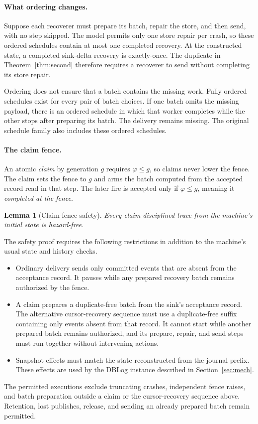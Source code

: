 \documentclass[sigplan,10pt]{acmart}
\theoremstyle{plain}
\newtheorem{lemma}{Lemma}[section]
\theoremstyle{definition}
\begin{document}
\paragraph{What ordering changes.}
Suppose each recoverer must prepare its batch, repair the store, and
then send, with no step skipped. The model permits only one store
repair per crash, so these ordered schedules contain at most one
completed recovery. At the constructed state, a completed sink-delta
recovery is exactly-once. The duplicate in
Theorem~\ref{thm:second} therefore requires a recoverer to send without
completing its store repair.

Ordering does not ensure that a batch contains the missing work.
Fully ordered schedules exist for every pair of batch choices. If one
batch omits the missing payload, there is an ordered schedule in
which that worker completes while the other stops after preparing
its batch. The delivery remains missing. The original schedule family
also includes these ordered schedules.

\paragraph{The claim fence.}
An atomic \emph{claim} by generation $g$ requires $\varphi \le g$, so
claims never lower the fence. The claim sets the fence to $g$ and arms
the batch computed from the accepted record read in that step. The later
fire is accepted only if $\varphi \le g$, meaning it
\emph{completed at the fence}.

\begin{lemma}[Claim-fence safety]\label{lem:claim}
Every claim-disciplined trace from the machine's initial state is
hazard-free.
\end{lemma}

The safety proof requires the following restrictions in addition to the
machine's usual state and history checks.
\begin{itemize}
\item Ordinary delivery sends only committed events that are absent from
  the acceptance record. It pauses while any prepared recovery batch
  remains authorized by the fence.
\item A claim prepares a duplicate-free batch from the sink's acceptance
  record. The alternative cursor-recovery sequence must use a
  duplicate-free suffix containing only events absent from that record.
  It cannot start while another prepared batch remains authorized, and
  its prepare, repair, and send steps must run together without
  intervening actions.
\item Snapshot effects must match the state reconstructed from the journal
  prefix. These effects are used by the DBLog instance described in
  Section~\ref{sec:mech}.
\end{itemize}
The permitted executions exclude truncating crashes, independent fence
raises, and batch preparation outside a claim or the cursor-recovery
sequence above. Retention, lost publishes, release, and sending an already
prepared batch remain permitted.
\end{document}
